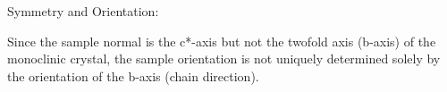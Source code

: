 Symmetry and Orientation:

Since the sample normal is the c*-axis but not the twofold axis (b-axis) of the monoclinic crystal, the sample orientation is not uniquely determined solely by the orientation of the b-axis (chain direction).
